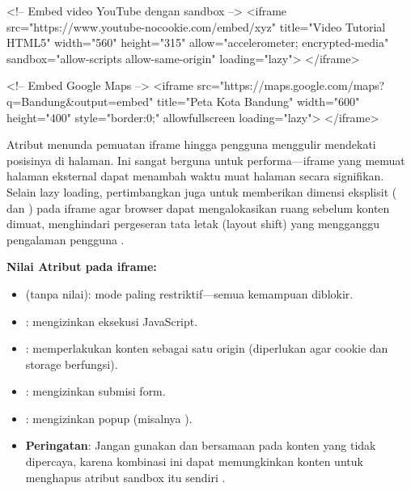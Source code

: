 \begin{webcode}[language=HTML, caption={iframe dengan atribut keamanan dan aksesibilitas}]
<!-- Embed video YouTube dengan sandbox -->
<iframe
  src="https://www.youtube-nocookie.com/embed/xyz"
  title="Video Tutorial HTML5"
  width="560" height="315"
  allow="accelerometer; encrypted-media"
  sandbox="allow-scripts allow-same-origin"
  loading="lazy">
</iframe>

<!-- Embed Google Maps -->
<iframe
  src="https://maps.google.com/maps?q=Bandung&output=embed"
  title="Peta Kota Bandung"
  width="600" height="400"
  style="border:0;"
  allowfullscreen
  loading="lazy">
</iframe>
\end{webcode}

Atribut  menunda pemuatan iframe hingga pengguna menggulir mendekati posisinya di halaman. Ini sangat berguna untuk performa---iframe yang memuat halaman eksternal dapat menambah waktu muat halaman secara signifikan. Selain lazy loading, pertimbangkan juga untuk memberikan dimensi eksplisit ( dan ) pada iframe agar browser dapat mengalokasikan ruang sebelum konten dimuat, menghindari pergeseran tata letak (layout shift) yang mengganggu pengalaman pengguna \cite{webdevHtml}.

\begin{catatan}
\textbf{Nilai Atribut  pada iframe:}
\begin{itemize}
  \item {} (tanpa nilai): mode paling restriktif---semua kemampuan diblokir.
  \item {}: mengizinkan eksekusi JavaScript.
  \item {}: memperlakukan konten sebagai satu origin (diperlukan agar cookie dan storage berfungsi).
  \item {}: mengizinkan submisi form.
  \item {}: mengizinkan popup (misalnya ).
  \item \textbf{Peringatan}: Jangan gunakan  dan  bersamaan pada konten yang tidak dipercaya, karena kombinasi ini dapat memungkinkan konten untuk menghapus atribut sandbox itu sendiri \cite{whatwgHtml}.
\end{itemize}
\end{catatan}

